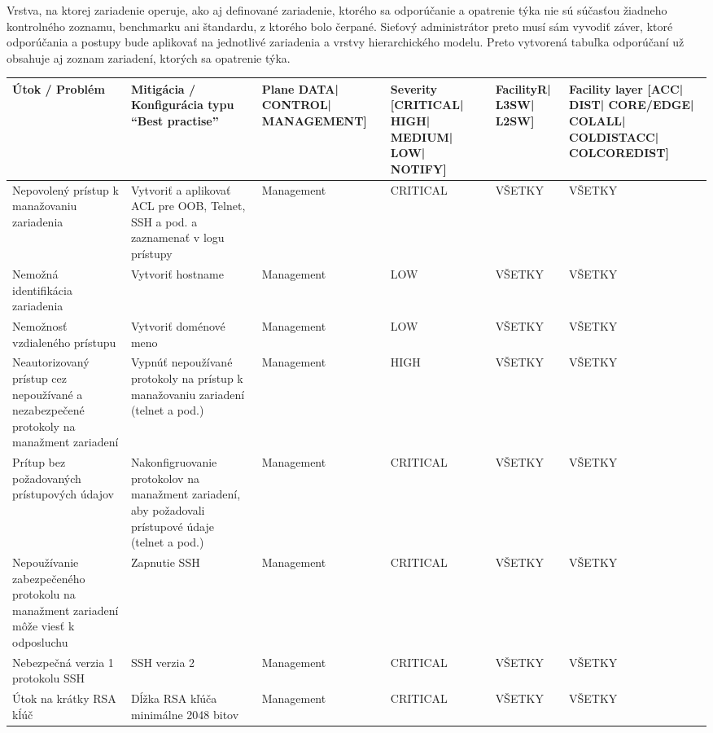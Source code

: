 Vrstva, na ktorej zariadenie operuje, ako aj definované zariadenie, ktorého sa odporúčanie a opatrenie týka nie sú súčasťou žiadneho kontrolného zoznamu, benchmarku ani štandardu, z ktorého bolo čerpané. Sieťový administrátor preto musí sám vyvodiť záver, ktoré odporúčania a postupy bude aplikovať na jednotlivé zariadenia a vrstvy hierarchického modelu. Preto vytvorená tabuľka odporúčaní už obsahuje aj zoznam zariadení, ktorých sa opatrenie týka.


\scriptsize
\begin{longtable}{|P{8em}|P{9em}|P{8em}|P{5em}|P{5em}|P{10em}|}
	\captionsetup{font=normalsize}
    \hline
    Útok / Problém & Mitigácia / Konfigurácia typu “Best practise” & Plane \hspace{2em}{[}DATA| CONTROL| \hbox{MANAGEMENT}{]} & Severity {[}\hbox{CRITICAL}| HIGH| MEDIUM| LOW| NOTIFY{]}\cite{McMillan2018} & Facility\hspace{1em}{[}R| L3SW| L2SW{]} & Facility layer \hspace{2em} {[}ACC| DIST| \hbox{CORE/EDGE}| COLALL| \hbox{COLDISTACC}| \hbox{COLCOREDIST}{]} \\ \hline
    \endhead
    Nepovolený prístup k manažovaniu zariadenia & Vytvoriť a aplikovať ACL pre OOB, Telnet, SSH a pod. a zaznamenať v logu prístupy & Management & CRITICAL & VŠETKY & VŠETKY \\ \hline
    Nemožná identifikácia zariadenia & Vytvoriť hostname & Management & LOW & VŠETKY & VŠETKY \\ \hline
    Nemožnosť vzdialeného prístupu & Vytvoriť doménové meno & Management & LOW & VŠETKY & VŠETKY \\ \hline
    Neautorizovaný prístup cez nepoužívané a nezabezpečené protokoly na manažment zariadení & Vypnúť nepoužívané protokoly na prístup k manažovaniu zariadení (telnet a pod.) & Management & HIGH & VŠETKY & VŠETKY \\ \hline
    Prítup bez požadovaných prístupových údajov & Nakonfigruovanie protokolov na manažment zariadení, aby požadovali prístupové údaje (telnet a pod.) & Management & CRITICAL & VŠETKY & VŠETKY \\ \hline
    Nepoužívanie zabezpečeného protokolu na manažment zariadení môže viesť k odposluchu & Zapnutie SSH & Management & CRITICAL & VŠETKY & VŠETKY \\ \hline
    Nebezpečná verzia 1 protokolu SSH & SSH verzia 2 & Management & CRITICAL & VŠETKY & VŠETKY \\ \hline
    Útok na krátky RSA kĺúč & Dĺžka RSA kľúča minimálne 2048 bitov & Management & CRITICAL & VŠETKY & VŠETKY \\ \hline

\end{longtable}
